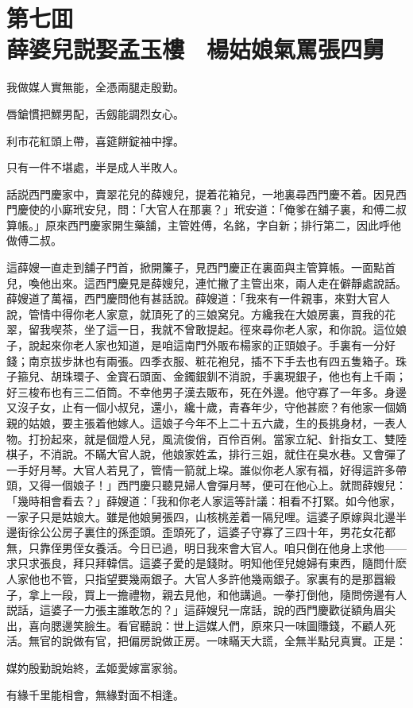 
\chapter*{第七囬　\\薛婆兒説娶孟玉樓　楊姑娘氣罵張四舅}


\begin{myquote}
我做媒人實無能，全憑兩腿走殷勤。

唇鎗慣把鰥男配，舌劔能調烈女心。

利市花紅頭上帶，喜筵餅錠袖中撑。

只有一件不堪處，半是成人半敗人。
\end{myquote}

話説西門慶家中，賣翠花兒的薛嫂兒，提着花箱兒，一地裏尋西門慶不着。因見西門慶使的小廝玳安兒，問：「大官人在那裏？」玳安道：「俺爹在舖子裏，和傅二叔算帳。」原來西門慶家開生藥舖，主管姓傅，名銘，字自新；排行第二，因此呼他做傅二叔。

這薛嫂一直走到舖子門首，掀開簾子，見西門慶正在裏面與主管算帳。一面點首兒，喚他出來。這西門慶見是薛嫂兒，連忙撇了主管出來，兩人走在僻靜處說話。薛嫂道了萬福，西門慶問他有甚話說。薛嫂道：「我來有一件親事，來對大官人說，管情中得你老人家意，就頂死了的三娘窝兒。方纔我在大娘房裏，買我的花翠，留我喫茶，坐了這一日，我就不曾敢提起。徑來尋你老人家，和你說。這位娘子，說起來你老人家也知道，是咱這南門外販布楊家的正頭娘子。手裏有一分好錢；南京拔步牀也有兩張。四季衣服、粧花袍兒，插不下手去也有四五隻箱子。珠子箍兒、胡珠環子、金寳石頭面、金鐲銀釧不消說，手裏現銀子，他也有上千兩；好三梭布也有三二佰筒。不幸他男子漢去販布，死在外邊。他守寡了一年多。身邊又沒子女，止有一個小叔兒，還小，纔十歲，青春年少，守他甚麽？有他家一個嫡親的姑娘，要主張着他嫁人。這娘子今年不上二十五六歲，生的長挑身材，一表人物。打扮起來，就是個燈人兒，風流俊俏，百伶百俐。當家立紀、針指女工、雙陸棋子，不消說。不瞞大官人說，他娘家姓孟，排行三姐，就住在臭水巷。又會彈了一手好月琴。大官人若見了，管情一箭就上垜。誰似你老人家有福，好得這許多帶頭，又得一個娘子！」西門慶只聽見婦人會彈月琴，便可在他心上。就問薛嫂兒：「幾時相會看去？」薛嫂道：「我和你老人家這等計議：相看不打緊。如今他家，一家子只是姑娘大。雖是他娘舅張四，山核桃差着一隔兒哩。這婆子原嫁與北邊半邊街徐公公房子裏住的孫歪頭。歪頭死了，這婆子守寡了三四十年，男花女花都無，只靠侄男侄女養活。今日已過，明日我來會大官人。咱只倒在他身上求他——求只求張良，拜只拜韓信。這婆子愛的是錢財。明知他侄兒媳婦有東西，隨問什麽人家他也不管，只指望要幾兩銀子。大官人多許他幾兩銀子。家裏有的是那囂緞子，拿上一段，買上一擔禮物，親去見他，和他講過。一拳打倒他，隨問傍邊有人説話，這婆子一力張主誰敢怎的？」這薛嫂兒一席話，說的西門慶歡従額角眉尖出，喜向腮邊笑臉生。看官聽說：世上這媒人們，原來只一味圖賺錢，不顧人死活。無官的說做有官，把偏房說做正房。一味瞞天大謊，全無半點兒真實。正是：
\begin{myquote}
媒妁殷勤說始終，孟姬愛嫁富家翁。

有緣千里能相會，無緣對面不相逢。
\end{myquote}

